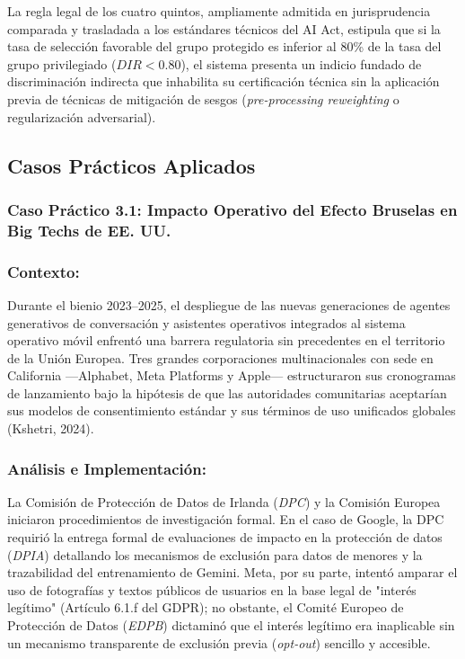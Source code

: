 La regla legal de los cuatro quintos, ampliamente admitida en jurisprudencia comparada y trasladada a los estándares técnicos del AI Act, estipula que si la tasa de selección favorable del grupo protegido es inferior al 80\% de la tasa del grupo privilegiado ($DIR < 0.80$), el sistema presenta un indicio fundado de discriminación indirecta que inhabilita su certificación técnica sin la aplicación previa de técnicas de mitigación de sesgos (\textit{pre-processing reweighting} o regularización adversarial).

\subsection{Casos Prácticos Aplicados}

\subsubsection{Caso Práctico 3.1: Impacto Operativo del Efecto Bruselas en Big Techs de EE. UU.}

\subsubsection*{Contexto:}
Durante el bienio 2023--2025, el despliegue de las nuevas generaciones de agentes generativos de conversación y asistentes operativos integrados al sistema operativo móvil enfrentó una barrera regulatoria sin precedentes en el territorio de la Unión Europea. Tres grandes corporaciones multinacionales con sede en California ---Alphabet, Meta Platforms y Apple--- estructuraron sus cronogramas de lanzamiento bajo la hipótesis de que las autoridades comunitarias aceptarían sus modelos de consentimiento estándar y sus términos de uso unificados globales (Kshetri, 2024).

\subsubsection*{Análisis e Implementación:}
La Comisión de Protección de Datos de Irlanda (\textit{DPC}) y la Comisión Europea iniciaron procedimientos de investigación formal. En el caso de Google, la DPC requirió la entrega formal de evaluaciones de impacto en la protección de datos (\textit{DPIA}) detallando los mecanismos de exclusión para datos de menores y la trazabilidad del entrenamiento de Gemini. Meta, por su parte, intentó amparar el uso de fotografías y textos públicos de usuarios en la base legal de "interés legítimo" (Artículo 6.1.f del GDPR); no obstante, el Comité Europeo de Protección de Datos (\textit{EDPB}) dictaminó que el interés legítimo era inaplicable sin un mecanismo transparente de exclusión previa (\textit{opt-out}) sencillo y accesible.

